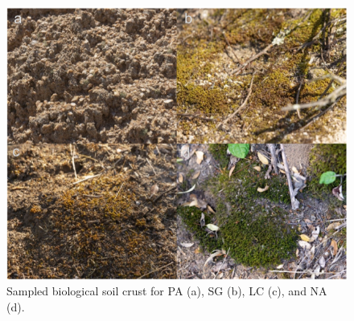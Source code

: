 \begin{figure}[H]
	\centering
	\includegraphics[width=1\textwidth]{img/M1-Figure_1.png}
	\caption{Sampled biological soil crust for PA (a), SG (b), LC (c), and NA (d).}
	\label{fig:M1-F1-Sampled_biocrust}
\end{figure}

\FloatBarrier

